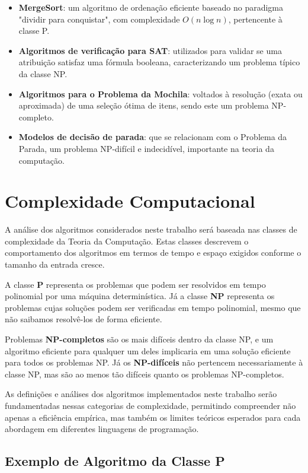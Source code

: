 \documentclass[12pt,oneside,a4paper]{report}
\begin{document}
\begin{itemize}
    \item \textbf{MergeSort}: um algoritmo de ordenação eficiente baseado no paradigma "dividir para conquistar", com complexidade \( O(n \log n) \), pertencente à classe P.
    \item \textbf{Algoritmos de verificação para SAT}: utilizados para validar se uma atribuição satisfaz uma fórmula booleana, caracterizando um problema típico da classe NP.
    \item \textbf{Algoritmos para o Problema da Mochila}: voltados à resolução (exata ou aproximada) de uma seleção ótima de itens, sendo este um problema NP-completo.
    \item \textbf{Modelos de decisão de parada}: que se relacionam com o Problema da Parada, um problema NP-difícil e indecidível, importante na teoria da computação.
\end{itemize}

\section{Complexidade Computacional}

A análise dos algoritmos considerados neste trabalho será baseada nas classes de complexidade da Teoria da Computação. Estas classes descrevem o comportamento dos algoritmos em termos de tempo e espaço exigidos conforme o tamanho da entrada cresce.

A classe \textbf{P} representa os problemas que podem ser resolvidos em tempo polinomial por uma máquina determinística. Já a classe \textbf{NP} representa os problemas cujas soluções podem ser verificadas em tempo polinomial, mesmo que não saibamos resolvê-los de forma eficiente.

Problemas \textbf{NP-completos} são os mais difíceis dentro da classe NP, e um algoritmo eficiente para qualquer um deles implicaria em uma solução eficiente para todos os problemas NP. Já os \textbf{NP-difíceis} não pertencem necessariamente à classe NP, mas são ao menos tão difíceis quanto os problemas NP-completos.

As definições e análises dos algoritmos implementados neste trabalho serão fundamentadas nessas categorias de complexidade, permitindo compreender não apenas a eficiência empírica, mas também os limites teóricos esperados para cada abordagem em diferentes linguagens de programação.

\subsection{Exemplo de Algoritmo da Classe P}
\end{document}
